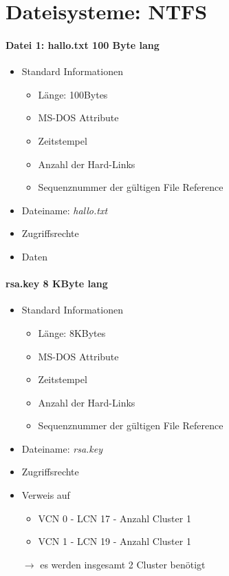 \documentclass[a4paper]{article}
\begin{document}
\section{Dateisysteme: NTFS}
\paragraph{Datei 1: hallo.txt 100 Byte lang}
\begin{itemize}
    \item Standard Informationen
        \begin{itemize}
            \item Länge: 100Bytes
            \item MS-DOS Attribute
            \item Zeitstempel
            \item Anzahl der Hard-Links
            \item Sequenznummer der gültigen File Reference
        \end{itemize}
    \item Dateiname: \textit{hallo.txt}
    \item Zugriffsrechte
    \item Daten
\end{itemize}

\paragraph{rsa.key 8 KByte lang}
\begin{itemize}
    \item Standard Informationen
        \begin{itemize}
            \item Länge: 8KBytes
            \item MS-DOS Attribute
            \item Zeitstempel
            \item Anzahl der Hard-Links
            \item Sequenznummer der gültigen File Reference
        \end{itemize}
    \item Dateiname: \textit{rsa.key}
    \item Zugriffsrechte
    \item Verweis auf 
        \begin{itemize}
            \item VCN 0 - LCN 17 - Anzahl Cluster 1
            \item VCN 1 - LCN 19 - Anzahl Cluster 1
        \end{itemize}
        $\rightarrow$ es werden insgesamt 2 Cluster benötigt
\end{itemize}
\end{document}
